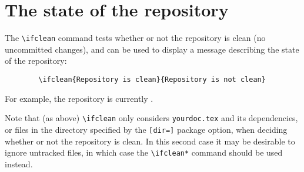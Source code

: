 \documentclass[12pt,a4paper]{article}
\begin{document}
	\section*{The state of the repository}
	The \verb+\ifclean+ command tests whether or not the repository is clean
	(no uncommitted changes), and can be used to display a message
	describing the state of the repository:
	\begin{verbatim}
		\ifclean{Repository is clean}{Repository is not clean}
	\end{verbatim}
	For example, the repository is currently \textbf{}.

	Note that (as above) \verb+\ifclean+ only considers \verb+yourdoc.tex+ and its
	dependencies, or files in the directory specified by the \verb+[dir=]+
	package option, when deciding whether or not the repository is clean.
	In this second case it may be desirable to ignore untracked files, in which
	case the \verb+\ifclean*+ command should be used instead.
\end{document}
